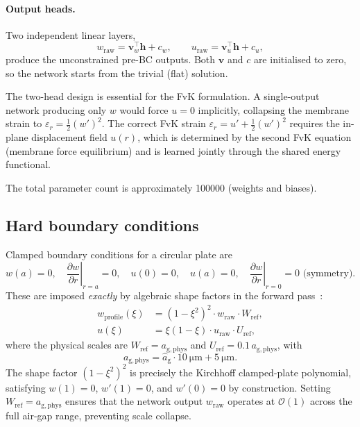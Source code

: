 \documentclass[review,12pt]{elsarticle}
\begin{document}
\paragraph{Output heads.}
Two independent linear layers,
\begin{equation}
    w_\mathrm{raw} = \mathbf{v}_w^\top \mathbf{h} + c_w, \qquad
    u_\mathrm{raw} = \mathbf{v}_u^\top \mathbf{h} + c_u,
    \label{eq:heads}
\end{equation}
produce the unconstrained pre-BC outputs. Both $\mathbf{v}$ and $c$ are
initialised to zero, so the network starts from the trivial (flat) solution.

The two-head design is essential for the FvK formulation. A single-output
network producing only $w$ would force $u = 0$ implicitly, collapsing the
membrane strain to $\varepsilon_r = \tfrac{1}{2}(w')^2$. The correct FvK
strain $\varepsilon_r = u' + \tfrac{1}{2}(w')^2$ requires the in-plane
displacement field $u(r)$, which is determined by the second FvK equation
(membrane force equilibrium) and is learned jointly through the shared energy
functional.

The total parameter count is approximately \num{100000} (weights and biases).

\subsection{Hard boundary conditions}
\label{sec:hbc}

Clamped boundary conditions for a circular plate are
\begin{equation}
    w(a) = 0, \quad \left.\frac{\partial w}{\partial r}\right|_{r=a} = 0, \quad
    u(0) = 0, \quad u(a) = 0, \quad
    \left.\frac{\partial w}{\partial r}\right|_{r=0} = 0 \text{ (symmetry)}.
    \label{eq:bcs}
\end{equation}
These are imposed \emph{exactly} by algebraic shape factors in the forward
pass~\cite{sukumar2022,lu2021}:
\begin{align}
    w_\mathrm{profile}(\xi) &= (1-\xi^2)^2 \cdot w_\mathrm{raw} \cdot W_\mathrm{ref},
    \label{eq:wBC} \\
    u(\xi) &= \xi(1-\xi) \cdot u_\mathrm{raw} \cdot U_\mathrm{ref},
    \label{eq:uBC}
\end{align}
where the physical scales are $W_\mathrm{ref} = a_\mathrm{g,phys}$ and
$U_\mathrm{ref} = 0.1\,a_\mathrm{g,phys}$, with
\begin{equation}
    a_\mathrm{g,phys} = \hat{a}_\mathrm{g} \cdot \SI{10}{\micro\metre}
                        + \SI{5}{\micro\metre}.
    \label{eq:ag_denorm}
\end{equation}
The shape factor $(1-\xi^2)^2$ is precisely the Kirchhoff clamped-plate
polynomial, satisfying $w(1)=0$, $w'(1)=0$, and $w'(0)=0$ by construction.
Setting $W_\mathrm{ref} = a_\mathrm{g,phys}$ ensures that the network output
$w_\mathrm{raw}$ operates at $\mathcal{O}(1)$ across the full air-gap range,
preventing scale collapse.
\end{document}
